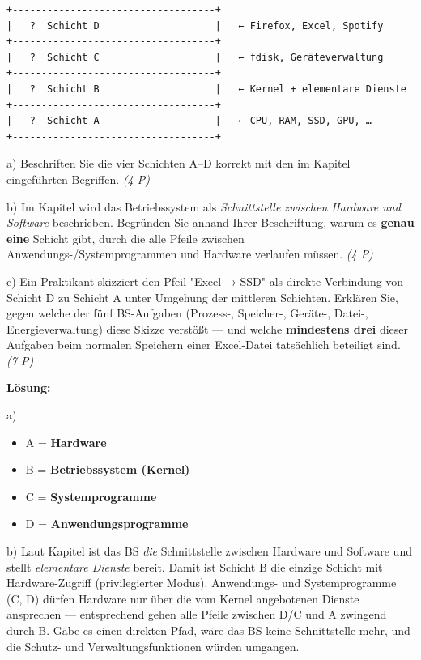\documentclass[11pt, a4paper]{article}
\begin{document}
\begin{lstlisting}
+-----------------------------------+
|   ?  Schicht D                    |   ← Firefox, Excel, Spotify
+-----------------------------------+
|   ?  Schicht C                    |   ← fdisk, Geräteverwaltung
+-----------------------------------+
|   ?  Schicht B                    |   ← Kernel + elementare Dienste
+-----------------------------------+
|   ?  Schicht A                    |   ← CPU, RAM, SSD, GPU, …
+-----------------------------------+
\end{lstlisting}


a) Beschriften Sie die vier Schichten A–D korrekt mit den im Kapitel eingeführten Begriffen. \textit{(4 P)}


b) Im Kapitel wird das Betriebssystem als \textit{Schnittstelle zwischen Hardware und Software} beschrieben. Begründen Sie anhand Ihrer Beschriftung, warum es \textbf{genau eine} Schicht gibt, durch die alle Pfeile zwischen Anwendungs-/Systemprogrammen und Hardware verlaufen müssen. \textit{(4 P)}


c) Ein Praktikant skizziert den Pfeil "Excel → SSD" als direkte Verbindung von Schicht D zu Schicht A unter Umgehung der mittleren Schichten. Erklären Sie, gegen welche der fünf BS-Aufgaben (Prozess-, Speicher-, Geräte-, Datei-, Energieverwaltung) diese Skizze verstößt — und welche \textbf{mindestens drei} dieser Aufgaben beim normalen Speichern einer Excel-Datei tatsächlich beteiligt sind. \textit{(7 P)}


\textbf{Lösung:}


a)

\begin{itemize}
  \item A = \textbf{Hardware}
  \item B = \textbf{Betriebssystem (Kernel)}
  \item C = \textbf{Systemprogramme}
  \item D = \textbf{Anwendungsprogramme}
\end{itemize}

b) Laut Kapitel ist das BS \textit{die} Schnittstelle zwischen Hardware und Software und stellt \textit{elementare Dienste} bereit. Damit ist Schicht B die einzige Schicht mit Hardware-Zugriff (privilegierter Modus). Anwendungs- und Systemprogramme (C, D) dürfen Hardware nur über die vom Kernel angebotenen Dienste ansprechen — entsprechend gehen alle Pfeile zwischen D/C und A zwingend durch B. Gäbe es einen direkten Pfad, wäre das BS keine Schnittstelle mehr, und die Schutz- und Verwaltungsfunktionen würden umgangen.
\end{document}
